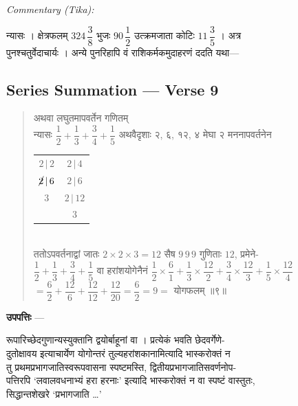 \documentclass[11pt,a4paper]{article}
\newcommand{\skt}[1]{{\devanagarifont\color{sktcolor} #1}}
\newenvironment{shloka}{%
  \begin{quote}%
  \smallskip%
  \devanagarifont\color{sktcolor}%
}{%
  \smallskip%
  \end{quote}%
}
\newenvironment{tika}{%
  \smallskip%
  \noindent\textit{Commentary (Tika):}\par%
  \smallskip%
  \hindifont\small%
}{%
  \par\smallskip%
}
\newenvironment{upapatti}{%
  \smallskip%
  \noindent\textbf{\devanagarifont उपपत्तिः} — \devanagarifont\small%
}{%
  \par\smallskip%
}
\begin{document}
\vspace{0.3cm}
\begin{tika}
\skt{न्यासः । क्षेत्रफलम्} $324\,\dfrac{3}{8}$ \skt{भुजः} $90\,\dfrac{1}{2}$ \skt{उत्क्रमजाता कोटिः} $11\,\dfrac{3}{5}$ । \skt{अत्र}\\
पुनश्चतुर्वेदाचार्यः । \skt{अन्ये पुनरिहापि वं राशिकर्मकमुदाहरणं ददति यथा—}
\end{tika}

\subsection*{Series Summation — Verse 9}

\begin{shloka}
\skt{अथवा लघुतमापवर्तेन गणितम्}\\[0.5em]
\skt{न्यासः} $\dfrac{1}{2} + \dfrac{1}{3} + \dfrac{3}{4} + \dfrac{1}{5}$ \skt{अथवैदृशाः २, ६, १२, ४ मेघा २ मननापवर्तनेन}\\[0.5em]
\begin{tabular}{c|c}
$2\,|\,2$ & $2\,|\,4$ \\
$\cancel{2}\,|\,6$ & $2\,|\,6$ \\
$3$ & $2\,|\,12$ \\
& $3$ \\
\end{tabular}
\\[0.5em]
\skt{ततोऽपवर्तनाद्वां जातः} $2 \times 2 \times 3 = 12$ \skt{सैष} $9\,9\,9$ \skt{गुणिताः} $12$, \skt{प्रमेने-}\\
$\dfrac{1}{2} + \dfrac{1}{3} + \dfrac{3}{4} + \dfrac{1}{5}$ \skt{वा हरांशयोगेनैनं} $\dfrac{1}{2} \times \dfrac{6}{1} + \dfrac{1}{3} \times \dfrac{12}{2} + \dfrac{3}{4} \times \dfrac{12}{3} + \dfrac{1}{5} \times \dfrac{12}{4}$\\
$= \dfrac{6}{2} + \dfrac{12}{6} + \dfrac{12}{12} + \dfrac{12}{20} = \dfrac{6}{2} = 9 = $ \skt{योगफलम्} ॥९॥
\end{shloka}

\vspace{0.5cm}

\begin{upapatti}
\skt{रूपारिच्छेदगुणान्यस्युक्तानि द्वयोर्बाहूनां वा । प्रत्येकं भवति छेदवर्गेणे-}\\
\skt{दुतोक्षावय इत्याचार्येण योगोन्तरं तुल्यहरांशकानामित्यादि भास्करोक्तं न}\\
\skt{तु प्रथमप्रभागजातिस्वरूपवासना स्पष्टमस्ति, द्वितीयप्रभागजातिसवर्णनोप-}\\
\skt{पत्तिरपि `लवालवधनाभ्यं हरा हरनाः' इत्यादि भास्करोक्तं न वा स्पष्टं वास्तुतः,}\\
\skt{सिद्धान्तशेखरे `प्रभागजाति \ldots'}
\end{upapatti}
\end{document}
